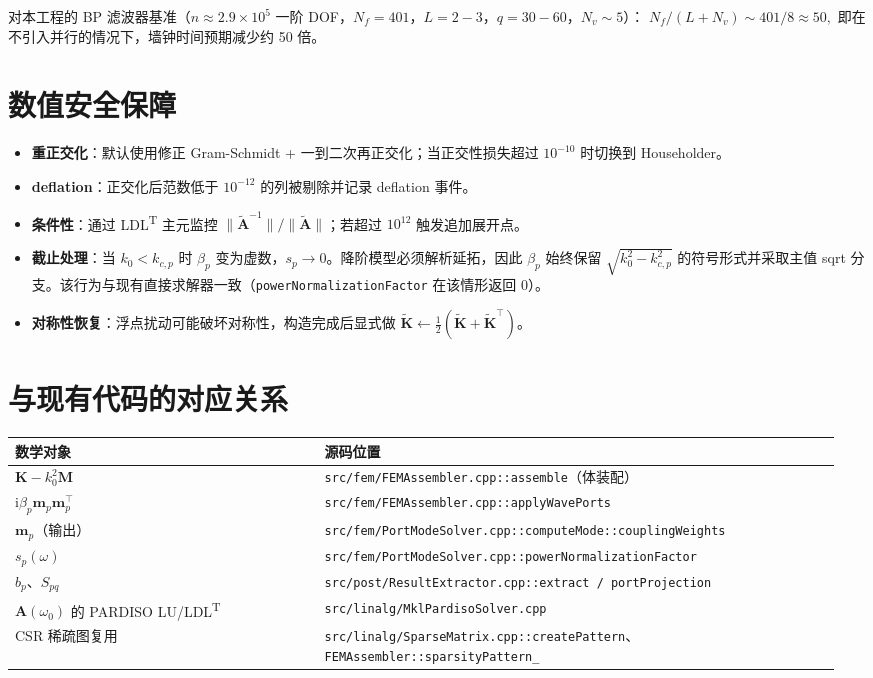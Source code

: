 \documentclass[11pt,a4paper]{ctexart}
\newcommand{\im}{\mathrm{i}}
\begin{document}
对本工程的 BP 滤波器基准（$n\!\approx\!2.9\!\times\!10^5$ 一阶 DOF，$N_f=401$，$L=2{-}3$，$q=30{-}60$，$N_v\!\sim\!5$）：
\(
  N_f / (L + N_v) \sim 401 / 8 \approx 50,
\)
即在不引入并行的情况下，墙钟时间预期减少约 50 倍。

\section{数值安全保障}

\begin{itemize}
\item \textbf{重正交化}：默认使用修正 Gram-Schmidt + 一到二次再正交化；当正交性损失超过 $10^{-10}$ 时切换到 Householder。
\item \textbf{deflation}：正交化后范数低于 $10^{-12}$ 的列被剔除并记录 deflation 事件。
\item \textbf{条件性}：通过 LDL\textsuperscript{T} 主元监控 $\|\widetilde{\bm A}^{-1}\|/\|\widetilde{\bm A}\|$；若超过 $10^{12}$ 触发追加展开点。
\item \textbf{截止处理}：当 $k_0 < k_{c,p}$ 时 $\beta_p$ 变为虚数，$s_p\to 0$。降阶模型必须解析延拓，因此 $\beta_p$ 始终保留 $\sqrt{k_0^2 - k_{c,p}^2}$ 的符号形式并采取主值 sqrt 分支。该行为与现有直接求解器一致（\texttt{powerNormalizationFactor} 在该情形返回 0）。
\item \textbf{对称性恢复}：浮点扰动可能破坏对称性，构造完成后显式做 $\widetilde{\bm K}\!\gets\!\tfrac12(\widetilde{\bm K}+\widetilde{\bm K}^{\!\top})$。
\end{itemize}

\section{与现有代码的对应关系}

\begin{table}[h]
\centering
\begin{tabular}{p{0.36\linewidth}p{0.6\linewidth}}
\toprule
数学对象 & 源码位置 \\
\midrule
$\bm K - k_0^2\bm M$ & \texttt{src/fem/FEMAssembler.cpp::assemble}（体装配）\\
$\im\beta_p\bm m_p\bm m_p^{\!\top}$ & \texttt{src/fem/FEMAssembler.cpp::applyWavePorts}\\
$\bm m_p$（输出） & \texttt{src/fem/PortModeSolver.cpp::computeMode::couplingWeights}\\
$s_p(\omega)$ & \texttt{src/fem/PortModeSolver.cpp::powerNormalizationFactor}\\
$b_p$、$S_{pq}$ & \texttt{src/post/ResultExtractor.cpp::extract / portProjection}\\
$\bm A(\omega_0)$ 的 PARDISO LU/LDL\textsuperscript{T} & \texttt{src/linalg/MklPardisoSolver.cpp}\\
CSR 稀疏图复用 & \texttt{src/linalg/SparseMatrix.cpp::createPattern}、\texttt{FEMAssembler::sparsityPattern\_}\\
\bottomrule
\end{tabular}
\end{table}
\end{document}
